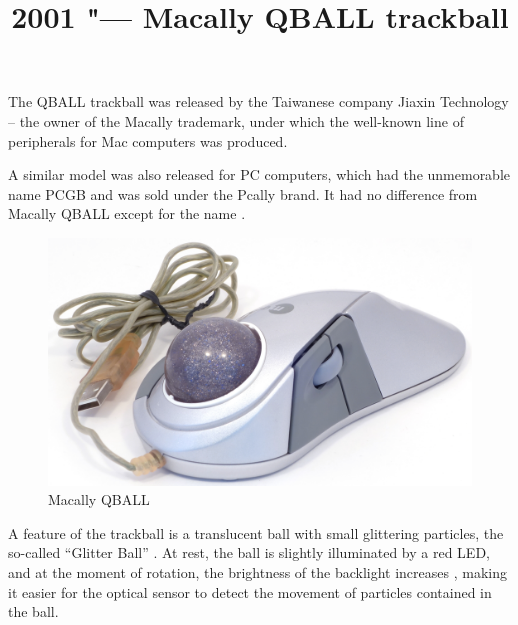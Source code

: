 \documentclass[11pt, a4paper]{article}
\begin{document}
\title{2001 "--- Macally QBALL trackball}
\date{}
\maketitle
{}
The QBALL trackball was released by the Taiwanese company Jiaxin Technology -- the owner of the Macally trademark, under which the well-known line of peripherals for Mac computers was produced.

A similar model was also released for PC computers, which had the unmemorable name PCGB and was sold under the Pcally brand. It had no difference from Macally QBALL except for the name \cite{trackballfan}.

\begin{figure}[h]
    \centering
    \includegraphics[scale=0.5]{2001_macally_qball/pic_30.jpg}
    \caption{Macally QBALL}
    \label{fig:MacallyQBALLPic}
\end{figure}

A feature of the trackball is a translucent ball with small glittering particles, the so-called ``Glitter Ball'' \cite{site}. At rest, the ball is slightly illuminated by a red LED, and at the moment of rotation, the brightness of the backlight increases \cite{review}, making it easier for the optical sensor to detect the movement of particles contained in the ball.
\end{document}

